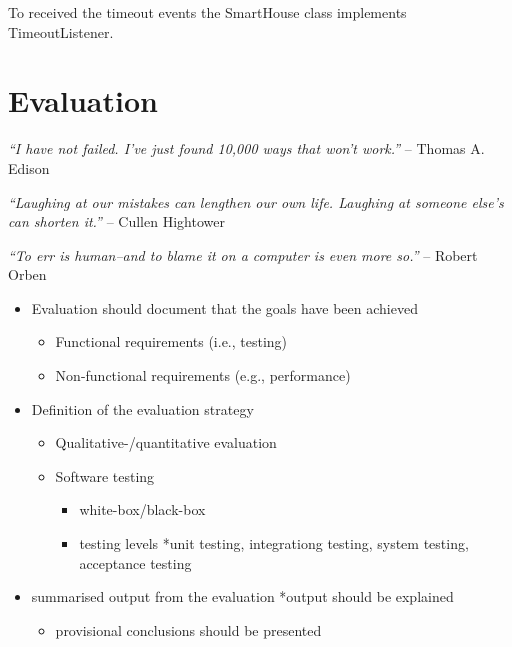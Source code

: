 To received the timeout events the SmartHouse class implements TimeoutListener. 

\chapter{Evaluation}
\label{evaluation}

\emph{``I have not failed. I've just found 10,000 ways that won't work.''} -- Thomas A. Edison

\emph{``Laughing at our mistakes can lengthen our own life. Laughing at someone else's can shorten it.''} -- Cullen Hightower

\emph{``To err is human--and to blame it on a computer is even more so.''} -- Robert Orben

\begin{itemize}
\item Evaluation should document that the goals have been achieved

\begin{itemize}
\item Functional requirements (i.e., testing)

\item Non-functional requirements (e.g., performance)

\end{itemize}

\item Definition of the evaluation strategy

\begin{itemize}
\item Qualitative-\slash quantitative evaluation

\item Software testing

\begin{itemize}
\item white-box\slash black-box

\item testing levels
*unit testing, integrationg testing, system testing, acceptance testing

\end{itemize}

\end{itemize}

\item summarised output from the evaluation
*output should be explained

\begin{itemize}
\item provisional conclusions should be presented

\end{itemize}

\end{itemize}

